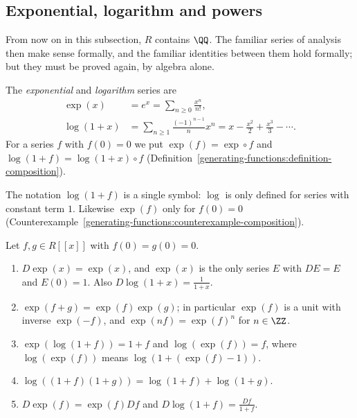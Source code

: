 \subsection{Exponential, logarithm and powers}\label{generating-functions:subsection-exp-log}

From now on in this subsection, $R$ contains $\QQ$. The familiar series of analysis then make sense formally, and the familiar identities between them hold formally; but they must be proved again, by
algebra alone.

\begin{definition}\label{generating-functions:definition-exp-log}
The \emph{exponential} and \emph{logarithm} series are
\[
\begin{aligned}
\exp(x) &= e^x = \sum_{n \geq 0}\frac{x^n}{n!},\\
\log(1 + x) &= \sum_{n \geq 1}\frac{(-1)^{n-1}}{n}x^n = x - \frac{x^2}{2} + \frac{x^3}{3} - \cdots.
\end{aligned}
\]
For a series $f$ with $f(0) = 0$ we put $\exp(f) = \exp \circ f$ and $\log(1 + f) = \log(1 + x) \circ f$ (Definition~\ref{generating-functions:definition-composition}).
\end{definition}

The notation $\log(1 + f)$ is a single symbol: $\log$ is only defined for series with constant term $1$. Likewise $\exp(f)$ only for $f(0) = 0$
(Counterexample~\ref{generating-functions:counterexample-composition}).

\begin{proposition}\label{generating-functions:proposition-exp-log}
Let $f, g \in R[[x]]$ with $f(0) = g(0) = 0$.
\begin{enumerate}
\item $D\exp(x) = \exp(x)$, and $\exp(x)$ is the only series $E$ with $DE = E$ and $E(0) = 1$. Also $D\log(1 + x) = \frac{1}{1 + x}$.
\item $\exp(f + g) = \exp(f)\exp(g)$; in particular $\exp(f)$ is a unit with inverse $\exp(-f)$, and $\exp(nf) = \exp(f)^n$ for $n \in \ZZ$.
\item $\exp(\log(1 + f)) = 1 + f$ and $\log(\exp(f)) = f$, where $\log(\exp(f))$ means $\log(1 + (\exp(f) - 1))$.
\item $\log((1 + f)(1 + g)) = \log(1 + f) + \log(1 + g)$.
\item $D\exp(f) = \exp(f)Df$ and $D\log(1 + f) = \frac{Df}{1 + f}$.
\end{enumerate}
\end{proposition}


